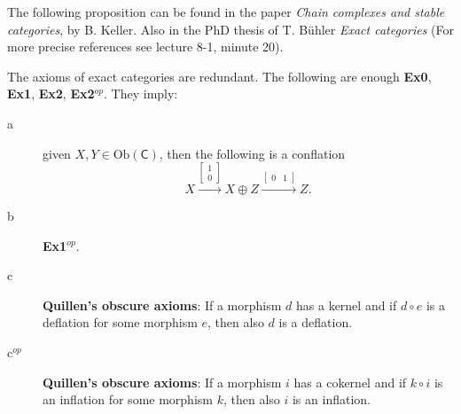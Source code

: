 The following proposition can be found in the paper \textit{Chain complexes and stable categories}, by B. Keller.
Also in the PhD thesis of  T. Bühler \textit{Exact categories}
(For more precise references see lecture 8-1, minute 20).
\begin{prop}[Keller]
	The axioms of exact categories are redundant.
	The following are enough \textbf{Ex0}, \textbf{Ex1}, \textbf{Ex2}, \textbf{Ex2}$^{op}$.
	They imply:
	\begin{description}
		\item[a] given $X, Y \in \mathrm{Ob} \left(\mathsf{C}\right)$, then the following is a conflation
			\begin{equation}
			X \xrightarrow{
				\begin{bmatrix}
					1 \\ 0
				\end{bmatrix} 
			} X \oplus Z
			\xrightarrow{
				\begin{bmatrix}
					0 & 1
				\end{bmatrix} 
			} Z
			.\end{equation} 
		\item[b] \textbf{Ex1}$^{op}$.
		\item[c] \textbf{Quillen's obscure axioms}: If a morphism $d$ has a kernel and if $d \circ e$ is a deflation for some morphism $e$, then also $d$ is a deflation.
		\item[c$^{op}$] \textbf{Quillen's obscure axioms}: If a morphism $i$ has a cokernel and if $k \circ i$ is an inflation for some morphism $k$, then also $i$ is an inflation.
	\end{description} 
\end{prop} 
